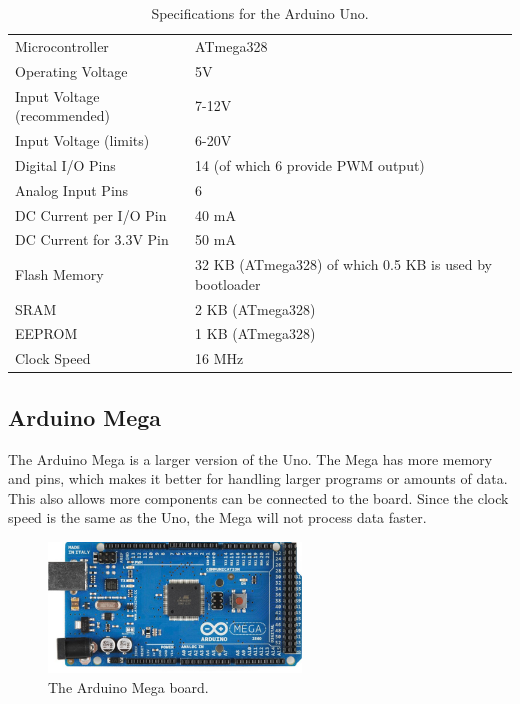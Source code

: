 \begin{table}
\begin{tabular}{| l | l |}
\hline
Microcontroller & ATmega328\\
Operating Voltage & 5V\\
Input Voltage (recommended) & 7-12V\\
Input Voltage (limits) & 6-20V\\
Digital I/O Pins & 14 (of which 6 provide PWM output)\\
Analog Input Pins & 6\\
DC Current per I/O Pin & 40 mA\\
DC Current for 3.3V Pin & 50 mA\\
Flash Memory & 32 KB (ATmega328) of which 0.5 KB is used by bootloader\\
SRAM & 2 KB (ATmega328)\\
EEPROM & 1 KB (ATmega328)\\
Clock Speed & 16 MHz\\
\hline
\end{tabular}
\caption{Specifications for the Arduino Uno.}
\end{table}
\label{tab:unospec}

\subsection{Arduino Mega}
The Arduino Mega is a larger version of the Uno. The Mega has more memory and pins, which makes it better for handling larger programs or amounts of data. This also allows more components can be connected to the board. Since the clock speed is the same as the Uno, the Mega will not process data faster.

\begin{figure}[h!]
\centering
\includegraphics[width=0.6\textwidth]{chapters/analysis/figs/ArduinoMega.jpg}
\caption{The Arduino Mega board\cite{arduinomegaimg}.}
\label{fig:arduinomega}
\end{figure}


